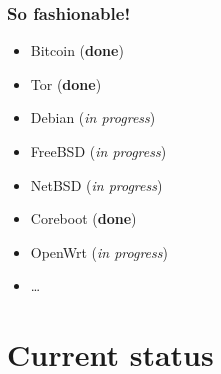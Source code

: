 \documentclass[14pt]{beamer}
\begin{document}
\begin{frame}
 \frametitle{So fashionable!}

 \begin{itemize}
 \item Bitcoin (\textbf{done})
 \item Tor (\textbf{done})
 \item Debian (\emph{in progress})
 \item FreeBSD (\emph{in progress})
 \item NetBSD (\emph{in progress})
 \item Coreboot (\textbf{done})
 \item OpenWrt (\emph{in progress})
 \item \ldots{}
\end{itemize}

\end{frame}

\begin{frame}[plain]
\end{frame}


\section{Current status}
\end{document}

